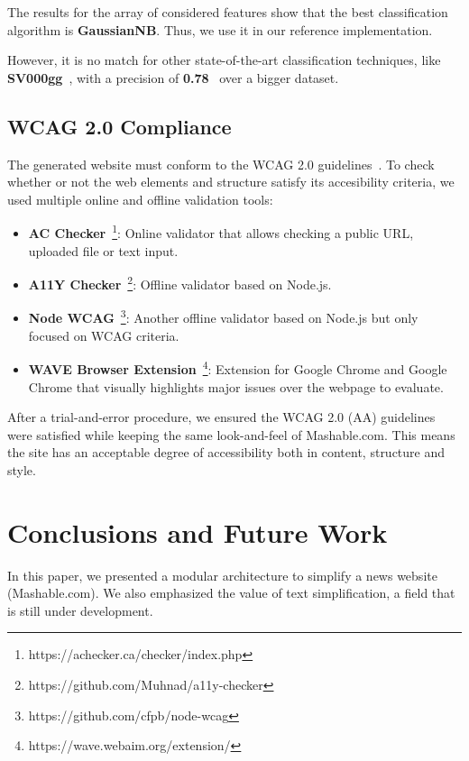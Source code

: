 \documentclass[11pt,a4paper]{article}
\begin{document}
The results for the array of considered features show that the best classification algorithm is \textbf{GaussianNB}. Thus, we use it in our reference implementation.

However, it is no match for other state-of-the-art classification techniques, like \textbf{SV000gg}~\cite{paetzold2016sv000gg}, with a precision of \textbf{0.78}~\cite{paetzold2016semeval} over a bigger dataset.

\subsection{WCAG 2.0 Compliance}

The generated website must conform to the WCAG 2.0 guidelines~\cite{caldwell2008web}. To check whether or not the web elements and structure satisfy its accesibility criteria, we used multiple online and offline validation tools:

\begin{itemize}
	\item{\textbf{AC Checker}~\footnote{https://achecker.ca/checker/index.php}: Online validator that allows checking a public URL, uploaded file or text input.}
	\item{\textbf{A11Y Checker}~\footnote{https://github.com/Muhnad/a11y-checker}: Offline validator based on Node.js.}
	\item{\textbf{Node WCAG}~\footnote{https://github.com/cfpb/node-wcag}: Another offline validator based on Node.js but only focused on WCAG criteria.}
	\item{\textbf{WAVE Browser Extension}~\footnote{https://wave.webaim.org/extension/}: Extension for Google Chrome and Google Chrome that visually highlights major issues over the webpage to evaluate.}
\end{itemize}

After a trial-and-error procedure, we ensured the WCAG 2.0 (AA) guidelines were satisfied while keeping the same look-and-feel of Mashable.com. This means the site has an acceptable degree of accessibility both in content, structure and style.

\section{Conclusions and Future Work}

In this paper, we presented a modular architecture to simplify a news website (Mashable.com). We also emphasized the value of text simplification, a field that is still under development.
\end{document}
